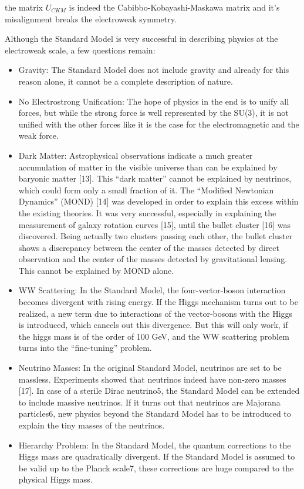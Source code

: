 the matrix $U_{CKM}$ is indeed the Cabibbo-Kobayashi-Maskawa matrix and it's misalignment breaks the electroweak symmetry.

\clearpage


Although the Standard Model is very successful in describing physics at the electroweak scale, a few questions remain:

\begin{itemize}
	\item Gravity: The Standard Model does not include gravity and already for this reason alone, it cannot be a complete description of nature.
	\item No Electrostrong Unification: The hope of physics in the end is to unify all forces, but while the strong force is well represented by the SU(3), it is not unified with the other forces like it is the case for the electromagnetic and the weak force.
	\item Dark Matter: Astrophysical observations indicate a much greater accumulation of matter in the visible universe than can be explained by baryonic matter [13]. This “dark matter” cannot be explained by neutrinos, which could form only a small fraction of it. The “Modified Newtonian Dynamics” (MOND) [14] was developed in order to explain this excess within the existing theories. It was very successful, especially in explaining the measurement of galaxy rotation curves [15], until the bullet cluster [16] was discovered. Being actually two clusters passing each other, the bullet cluster shows a discrepancy between the center of the masses detected by direct observation and the center of the masses detected by gravitational lensing. This cannot be explained by MOND alone.
	\item WW Scattering: In the Standard Model, the four-vector-boson interaction becomes divergent with rising energy. If the Higgs mechanism turns out to be realized, a new term due to interactions of the vector-bosons with the Higgs is introduced, which cancels out this divergence. But this will only work, if the higgs mass is of the order of 100 GeV, and the WW scattering problem turns into the “fine-tuning” problem.
	\item Neutrino Masses: In the original Standard Model, neutrinos are set to be massless. Experiments showed that neutrinos indeed have non-zero masses [17]. In case of a sterile Dirac neutrino5, the Standard Model can be extended to include massive neutrinos. If it turns out that neutrinos are Majorana particles6, new physics beyond the Standard Model has to be introduced to explain the tiny masses of the neutrinos.
	\item Hierarchy Problem: In the Standard Model, the quantum corrections to the Higgs mass are quadratically divergent. If the Standard Model is assumed to be valid up to the Planck scale7, these corrections are huge compared to the physical Higgs mass.
\end{itemize}

